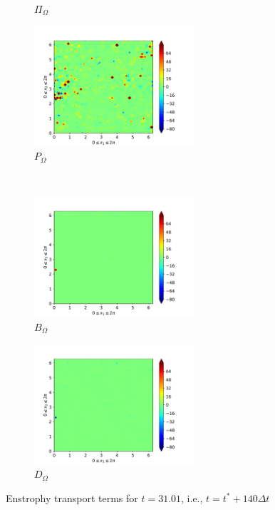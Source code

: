 \begin{figure}[H]
\begin{subfigure}{0.45\textwidth}
        \caption{$\Pi_{\Omega}$}
    \end{subfigure}
    \newline
    \begin{subfigure}{0.45\textwidth}
        \includegraphics[height=1.75in]{media/run-cds-65/P-enst-1480}
        \caption{$P_{\Omega}$}
    \end{subfigure}
    ~
    \begin{subfigure}{0.45\textwidth}
        \includegraphics[height=1.75in]{media/run-cds-65/B-enst-1480}
        \caption{$B_{\Omega}$}
    \end{subfigure}
    \newline
    \begin{subfigure}{0.45\textwidth}
        \includegraphics[height=1.75in]{media/run-cds-65/D-enst-1480}
        \caption{$D_{\Omega}$}
    \end{subfigure}
    \caption{Enstrophy transport terms for $t=31.01$, i.e., $t=t^{\ast} + 140 \Delta t$}
\end{figure}

\newpage

